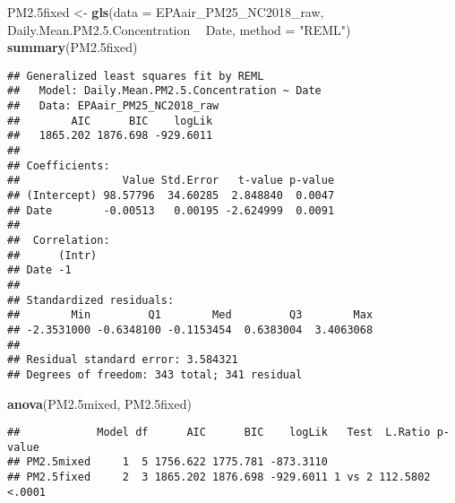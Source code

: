 \documentclass[]{article}
\newenvironment{Shaded}{\begin{snugshade}}{\end{snugshade}}
\newcommand{\KeywordTok}[1]{\textcolor[rgb]{0.13,0.29,0.53}{\textbf{#1}}}
\newcommand{\DataTypeTok}[1]{\textcolor[rgb]{0.13,0.29,0.53}{#1}}
\newcommand{\FloatTok}[1]{\textcolor[rgb]{0.00,0.00,0.81}{#1}}
\newcommand{\StringTok}[1]{\textcolor[rgb]{0.31,0.60,0.02}{#1}}
\newcommand{\OperatorTok}[1]{\textcolor[rgb]{0.81,0.36,0.00}{\textbf{#1}}}
\newcommand{\NormalTok}[1]{#1}
\begin{document}
\begin{Shaded}
\begin{Highlighting}[]
\NormalTok{PM2.5fixed <-}\StringTok{ }\KeywordTok{gls}\NormalTok{(}\DataTypeTok{data =}\NormalTok{ EPAair_PM25_NC2018_raw,}
\NormalTok{                  Daily.Mean.PM2.}\FloatTok{5.}\NormalTok{Concentration }\OperatorTok{~}\StringTok{ }\NormalTok{Date,}
                  \DataTypeTok{method =} \StringTok{"REML"}\NormalTok{)}
\KeywordTok{summary}\NormalTok{(PM2.5fixed) }
\end{Highlighting}
\end{Shaded}

\begin{verbatim}
## Generalized least squares fit by REML
##   Model: Daily.Mean.PM2.5.Concentration ~ Date 
##   Data: EPAair_PM25_NC2018_raw 
##        AIC      BIC    logLik
##   1865.202 1876.698 -929.6011
## 
## Coefficients:
##                Value Std.Error   t-value p-value
## (Intercept) 98.57796  34.60285  2.848840  0.0047
## Date        -0.00513   0.00195 -2.624999  0.0091
## 
##  Correlation: 
##      (Intr)
## Date -1    
## 
## Standardized residuals:
##        Min         Q1        Med         Q3        Max 
## -2.3531000 -0.6348100 -0.1153454  0.6383004  3.4063068 
## 
## Residual standard error: 3.584321 
## Degrees of freedom: 343 total; 341 residual
\end{verbatim}

\begin{Shaded}
\begin{Highlighting}[]
\KeywordTok{anova}\NormalTok{(PM2.5mixed, PM2.5fixed) }
\end{Highlighting}
\end{Shaded}

\begin{verbatim}
##            Model df      AIC      BIC    logLik   Test  L.Ratio p-value
## PM2.5mixed     1  5 1756.622 1775.781 -873.3110                        
## PM2.5fixed     2  3 1865.202 1876.698 -929.6011 1 vs 2 112.5802  <.0001
\end{verbatim}
\end{document}
